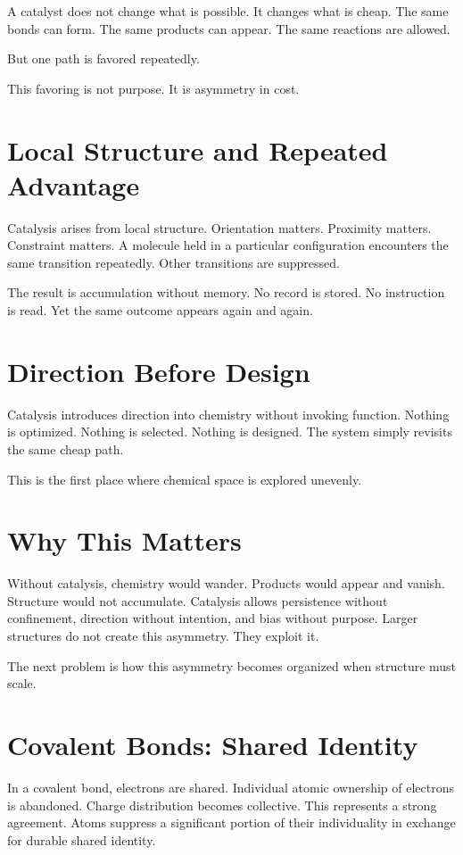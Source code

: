 \documentclass[11pt,twoside,openright]{book}
\begin{document}
A catalyst does not change what is possible. It changes what is cheap. The same bonds can form. The same products can appear. The same reactions are allowed.

But one path is favored repeatedly.

This favoring is not purpose. It is asymmetry in cost.

\section*{Local Structure and Repeated Advantage}

Catalysis arises from local structure. Orientation matters. Proximity matters. Constraint matters. A molecule held in a particular configuration encounters the same transition repeatedly. Other transitions are suppressed.

The result is accumulation without memory. No record is stored. No instruction is read. Yet the same outcome appears again and again.

\section*{Direction Before Design}

Catalysis introduces direction into chemistry without invoking function. Nothing is optimized. Nothing is selected. Nothing is designed. The system simply revisits the same cheap path.

This is the first place where chemical space is explored unevenly.

\section*{Why This Matters}

Without catalysis, chemistry would wander. Products would appear and vanish. Structure would not accumulate. Catalysis allows persistence without confinement, direction without intention, and bias without purpose. Larger structures do not create this asymmetry. They exploit it.

The next problem is how this asymmetry becomes organized when structure must scale.

\section*{Covalent Bonds: Shared Identity}

In a covalent bond, electrons are shared. Individual atomic ownership of electrons is abandoned. Charge distribution becomes collective. This represents a strong agreement. Atoms suppress a significant portion of their individuality in exchange for durable shared identity.
\end{document}
